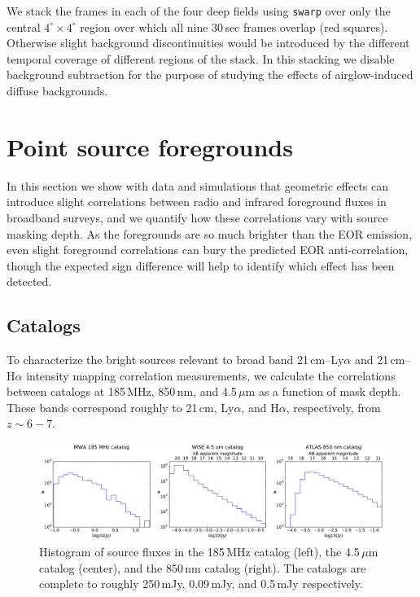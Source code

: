 \documentclass[numberedappendix]{emulateapj}
\begin{document}
We stack the frames in each of the four deep fields using {\tt swarp} over only the central $4^\circ\times 4^\circ$ region over which all nine 30\,sec frames overlap (red squares). Otherwise slight background discontinuities would be introduced by the different temporal coverage of different regions of the stack. In this stacking we disable background subtraction for the purpose of studying the effects of airglow-induced diffuse backgrounds.

\section{Point source foregrounds}
\label{sec:pointsourcefgs}

In this section we show with data and simulations that geometric effects can introduce slight correlations between radio and infrared foreground fluxes in broadband surveys, and we quantify how these correlations vary with source masking depth. As the foregrounds are so much brighter than the EOR emission, even slight foreground correlations can bury the predicted EOR anti-correlation, though the expected sign difference will help to identify which effect has been detected.

\subsection{Catalogs}
\label{sec:catalogs}

To characterize the bright sources relevant to broad band  21\,cm--Ly$\alpha$ and  21\,cm--H$\alpha$ intensity mapping correlation measurements, we calculate the correlations between catalogs at 185\,MHz, 850\,nm, and 4.5\,$\mu$m as a function of mask depth. These bands correspond roughly to 21\,cm, Ly$\alpha$, and H$\alpha$, respectively, from $z\sim6-7$. 

\begin{figure}[t]
\centering
\includegraphics[width=6.5in]{catalog_histograms.pdf}
\caption[Histogram of source fluxes in the 185\,MHz, 850\,nm, and 4.5\,$\mu$m catalogs.]{Histogram of source fluxes in the 185\,MHz catalog (left), the 4.5\,$\mu$m catalog (center), and the 850\,nm catalog (right). The catalogs are complete to roughly 250\,mJy, 0.09\,mJy, and 0.5\,mJy respectively.}
\label{fig:cataloghistograms}
\end{figure}
\end{document}
